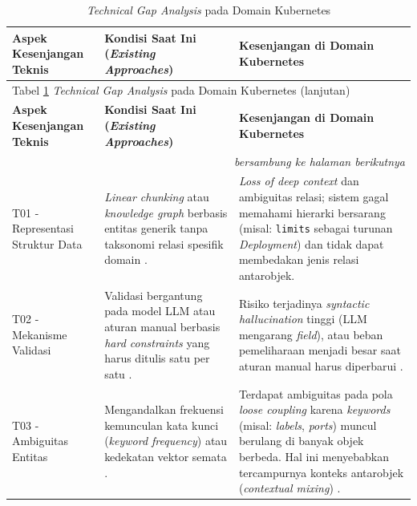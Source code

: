 ﻿\renewcommand{\arraystretch}{1.1}
\captionsetup[longtable]{justification=raggedright,singlelinecheck=false}

\begin{longtable}{ p{3cm} p{5cm} p{5cm} }
\caption{\textit{Technical Gap Analysis} pada Domain Kubernetes}
\label{tbl:comparison_existing_graphRAG} \\ \hline
\textbf{Aspek Kesenjangan Teknis} & \textbf{Kondisi Saat Ini (\textit{Existing Approaches})} & \textbf{Kesenjangan di Domain Kubernetes} \\ \hline
\endfirsthead

\multicolumn{3}{l}{Tabel \ref{tbl:comparison_existing_graphRAG} \textit{Technical Gap Analysis} pada Domain Kubernetes (lanjutan)} \\ \hline
\textbf{Aspek Kesenjangan Teknis} & \textbf{Kondisi Saat Ini (\textit{Existing Approaches})} & \textbf{Kesenjangan di Domain Kubernetes} \\ \hline
\endhead

\hline
\multicolumn{3}{r}{\textit{bersambung ke halaman berikutnya}} \\
\endfoot

\hline
\endlastfoot

T01 - Representasi Struktur Data &
\textit{Linear chunking} atau \textit{knowledge graph} berbasis entitas generik tanpa taksonomi relasi spesifik domain \parencite{cao2025neusymrag, civiot2025graphrag, hsgrag2025acm}. &
\textit{Loss of deep context} dan ambiguitas relasi; sistem gagal memahami hierarki bersarang (misal: \texttt{limits} sebagai turunan \textit{Deployment}) dan tidak dapat membedakan jenis relasi antarobjek. \\ \hline

T02 - Mekanisme Validasi &
Validasi bergantung pada model LLM atau aturan manual berbasis \textit{hard constraints} yang harus ditulis satu per satu \parencite{wan2025empowering}. &
Risiko terjadinya \textit{syntactic hallucination} tinggi (LLM mengarang \textit{field}), atau beban pemeliharaan menjadi besar saat aturan manual harus diperbarui \parencite{rag_survey}. \\ \hline

T03 - Ambiguitas Entitas &
Mengandalkan frekuensi kemunculan kata kunci (\textit{keyword frequency}) atau kedekatan vektor semata \parencite{rag_survey}. &
Terdapat ambiguitas pada pola \textit{loose coupling} karena \textit{keywords} (misal: \textit{labels}, \textit{ports}) muncul berulang di banyak objek berbeda. Hal ini menyebabkan tercampurnya konteks antarobjek (\textit{contextual mixing}) \parencite{kotstein_restberta_2024}. \\ \hline


\end{longtable}
